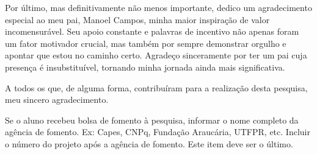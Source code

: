\begin{agradecimentos}
Por último, mas definitivamente não menos importante, dedico um agradecimento especial ao meu pai, Manoel Campos, minha maior inspiração de valor incomensurável. Seu apoio constante e palavras de incentivo não apenas foram um fator motivador crucial, mas também por sempre demonstrar orgulho e apontar que estou no caminho certo. Agradeço sinceramente por ter um pai cuja presença é insubstituível, tornando minha jornada ainda mais significativa.

A todos os que, de alguma forma, contribuíram para a realização desta pesquisa, meu sincero agradecimento.

Se o aluno recebeu bolsa de fomento à pesquisa, informar o nome completo da agência de fomento. Ex: Capes, CNPq, Fundação Araucária, UTFPR, etc. Incluir o número do projeto após a agência de fomento. Este item deve ser o último.

\end{agradecimentos}
